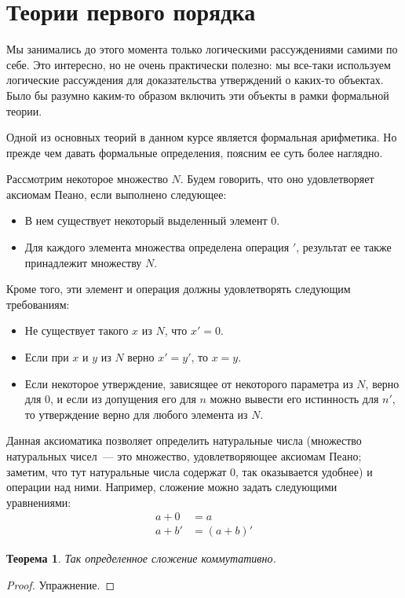 \documentclass[a4paper,11pt]{article}
\newtheorem{thm}{Теорема}[section]
\theoremstyle{definition}
\begin{document}
\section{Теории первого порядка}
Мы занимались до этого момента только логическими рассуждениями самими по себе.
Это интересно, но не очень практически полезно: мы все-таки используем
логические рассуждения для доказательства утверждений о каких-то объектах. Было
бы разумно каким-то образом включить эти объекты в рамки формальной теории.

Одной из основных теорий в данном курсе является формальная арифметика. Но
прежде чем давать формальные определения, поясним ее суть более наглядно.

Рассмотрим некоторое множество $N$. Будем говорить, что оно удовлетворяет
аксиомам Пеано, если выполнено следующее:
\begin{itemize}
\item В нем существует некоторый выделенный элемент $0$.
\item Для каждого элемента множества определена операция $'$, результат ее также
  принадлежит множеству $N$.
\end{itemize}
Кроме того, эти элемент и операция должны удовлетворять следующим требованиям:
\begin{itemize}
\item Не существует такого $x$ из $N$, что $x' = 0$.
\item Если при $x$ и $y$ из $N$ верно $x' = y'$, то $x = y$.
\item Если некоторое утверждение, зависящее от некоторого параметра из $N$,
  верно для $0$, и если из допущения его для $n$ можно вывести его истинность
  для $n'$, то утверждение верно для любого элемента из $N$.
\end{itemize}

Данная аксиоматика позволяет определить натуральные числа (множество
натуральных чисел~--- это множество, удовлетворяющее аксиомам Пеано; заметим,
что тут натуральные числа содержат $0$, так оказывается удобнее) и операции над
ними. Например, сложение можно задать следующими уравнениями:
\begin{align*}
a + 0 &= a\\
a + b' &= (a + b)'
\end{align*}

\begin{thm}
Так определенное сложение коммутативно.
\end{thm}
\begin{proof}
Упражнение.
\end{proof}
\end{document}

